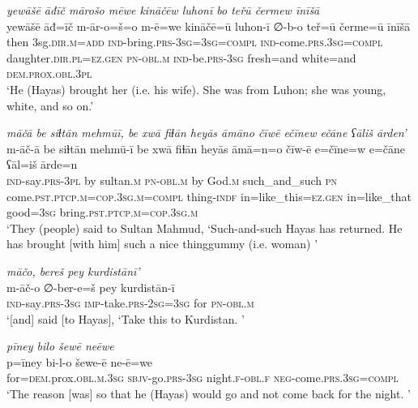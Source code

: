 \ea \label{ŽH.65}
\textit{yewāšē āđīč mārošo mēwe kināčēw luhonī bo teřū čermew īnīšā} \\ 
\gll yewāšē āđ=īč m-ār-o=š=o m-ē=we kināčē=ū luhon-ī ∅-b-o teř=ū čerme=ū īnīšā \\ 
 then 3sg\textsc{.dir}\textsc{.m}\textsc{=add} \textsc{ind-}bring\textsc{.prs}\textsc{-3sg}\textsc{=3sg}\textsc{=compl} \textsc{ind-}come\textsc{.prs}\textsc{.3sg}\textsc{=compl} daughter\textsc{.dir}\textsc{.pl}\textsc{=ez}\textsc{.gen} \textsc{pn}\textsc{-obl}\textsc{.m} \textsc{ind-}be\textsc{.prs}\textsc{-3sg} fresh=and white=and \textsc{dem.prox}\textsc{.obl}\textsc{.3pl} \\ 
\glt `He (Hayas) brought her (i.e. his wife). She was from Luhon; she was young, white, and so on.'
\z 
 
\ea \label{ŽH.66}
\textit{māčā be siɫtān mehmūī, be xwā fiɫān heyās āmāno čīwē ečīnew ečāne ʕāliš ārden’} \\ 
\gll m-āč-ā be siɫtān mehmū-ī be xwā fiɫān heyās āmā=n=o čīw-ē e=čīne=w e=čāne ʕāl=iš ārde=n \\ 
 \textsc{ind-}say\textsc{.prs}\textsc{-3pl} by sultan\textsc{.m} \textsc{pn}\textsc{-obl}\textsc{.m} by God\textsc{.m} such\_and\_such \textsc{pn} come\textsc{.pst}\textsc{.ptcp}\textsc{.m}\textsc{=cop}\textsc{.3sg}\textsc{.m}\textsc{=compl} thing\textsc{-indf} in=like\_this\textsc{=ez}\textsc{.gen} in=like\_that good\textsc{=3sg} bring\textsc{.pst}\textsc{.ptcp}\textsc{.m}\textsc{=cop}\textsc{.3sg}\textsc{.m} \\ 
\glt `They (people) said to Sultan Mahmud, ‘Such-and-such Hayas has returned. He has brought [with him] such a nice thinggummy (i.e. woman)  '
\z 
 
\ea \label{ŽH.69}
\textit{māčo, bereš pey kurdistānī’} \\ 
\gll m-āč-o ∅-ber-e=š pey kurdistān-ī \\ 
 \textsc{ind-}say\textsc{.prs}\textsc{-3sg} \textsc{imp-}take\textsc{.prs}-\textsc{2sg}\textsc{=3sg} for \textsc{pn}\textsc{-obl}\textsc{.m} \\ 
\glt `[and] said [to Hayas], ‘Take this to Kurdistan. '
\z 
 
\ea \label{ŽH.70}
\textit{pīney bilo šewē neēwe} \\ 
\gll p=īney bi-l-o šewe-ē ne-ē=we \\ 
 for\textsc{=dem}.prox\textsc{.obl}\textsc{.m}\textsc{.3sg} \textsc{sbjv-}go\textsc{.prs}\textsc{-3sg} night\textsc{\textsc{.f}}\textsc{-obl}\textsc{\textsc{.f}} \textsc{neg-}come\textsc{.prs}\textsc{.3sg}\textsc{=compl} \\ 
\glt `The reason [was] so that he (Hayas) would go and not come back for the night. '
\z 
 
